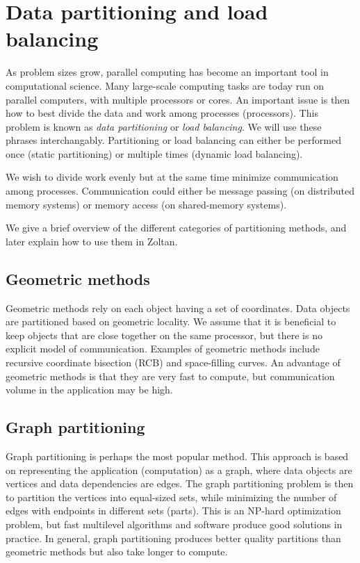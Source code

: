 %
%
\chapter{Data partitioning and load balancing}
\label{cha:lb}
As problem sizes grow, parallel computing has become an important tool
in computational science. Many large-scale computing tasks are
today run on parallel computers, with multiple processors or cores.
An important issue is then how to best divide the data and work
among processes (processors). This problem is known as \emph{data partitioning}
or \emph{load balancing}. We will use these phrases interchangably.
Partitioning or load balancing can either be performed once
(static partitioning) or multiple times (dynamic load balancing).

We wish to divide work evenly but at the same time minimize
communication among processes. Communication could either be
message passing (on distributed memory systems) or memory access
(on shared-memory systems).

We give a brief overview of the different categories of partitioning methods,
and later explain how to use them in Zoltan.


\section{Geometric methods}
Geometric methods rely on each object having a set of coordinates.
Data objects are partitioned based on geometric locality.
We assume that it is beneficial to keep objects that are close together on
the same processor, but there is no explicit model of communication.
Examples of geometric methods include recursive coordinate bisection (RCB)
and space-filling curves. An advantage of geometric methods is that
they are very fast to compute, but communication volume in
the application may be high.

\section{Graph partitioning}
Graph partitioning is perhaps the most popular method. This approach is
based on representing the application
(computation) as a graph, where data objects are vertices and
data dependencies are edges. The graph partitioning problem is then
to partition the vertices into equal-sized sets, while minimizing the
number of edges with endpoints in different sets (parts).
This is an NP-hard optimization problem, but fast multilevel
algorithms and software produce good solutions in practice.
In general, graph partitioning produces better quality partitions
than geometric methods but also take longer to compute.


